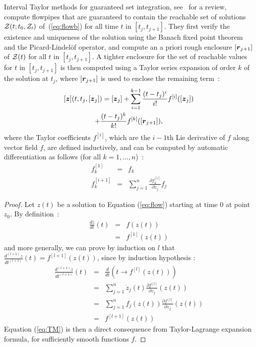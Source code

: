 \documentclass{sig-alternate-05-2015} %
\begin{document}
Interval Taylor methods for guaranteed set integration, see~\cite{Nedialkov99} for a review, compute flowpipes that are guaranteed
 to contain the reachable set of solutions 
${\cal Z}(t;t_0, {\cal Z_0})$ of~(\ref{eq:flowb}) for all time $t$ in $[t_j,t_{j+1}]$. They first verify the existence and uniqueness of 
the solution using the Banach fixed point theorem and the Picard-Lindel\"of operator, and compute an a priori rough enclosure $[{\r}_{j+1}]$ of 
   ${\cal Z}(t)$ for all $t$ in $[t_j,t_{j+1}]$. A tighter enclosure for the set of reachable values for $t$ in $[t_j,t_{j+1}]$ is then computed 
using a Taylor series expansion of order $k$ of the solution at $t_j$, where $[{\r}_{j+1}]$ is used to enclose the remaining term~: 
\begin{multline} 
[\z](t,t_j,[{\z}_j]) =  [{\z}_j] + \sum\limits_{i=1}^{k-1} \frac{(t-t_j)^i}{i !} f^{[i]}([{\z}_j])\\
 + \frac{(t-t_j)^k}{k !} f^{[k]}([{\r}_{j+1}]),
\label{eq:TM}
\end{multline}
where the Taylor coefficients $f^{[i]}$, which are the $i-1$th Lie derivative of $f$ along
vector field $f$, are defined inductively, and 
can be computed by automatic differentiation as follows (for all $k=1,\ldots,n$)~: 
\begin{eqnarray}
f^{[1]}_k & = & f_k \\
f^{[i+1]}_k & = & \sum\limits_{j=1}^n \frac{\partial{f^{[i]}_k}}{\partial z_j} f_j
\label{Lie1}
\end{eqnarray}

\begin{proof}
Let $z(t)$ be a solution to Equation (\ref{eq:flow}) starting at
time 0 at point $z_0$. By definition~: 
$$
\begin{array}{rcl}
\frac{d z}{d t}(t) & = & f(z(t)) \\
& = & f^{[1]}(z(t))
\end{array}$$
\noindent and more generally, we can prove by induction on $l$ that 
$\frac{d^{(l+1)} z}{dt^{(l+1)}}(t) = f^{[l+1]}(z(t))$, 
since by induction hypothesis :
$$\begin{array}{rcl}
\frac{d^{(l+1)} z}{dt^{(l+1)}}(t) & = & \frac{d}{dt}\left(t \rightarrow
f^{[l]}(z(t))\right) \\
& = & \sum\limits_{j=1}^n \dot{z}_j(t) \frac{\partial f^{[l]}}{\partial z_j}(z(t)) \\
& = & \sum\limits_{j=1}^n f_j(z(t)) \frac{\partial f^{[l]}}{\partial z_j}(z(t)) \\
& = & f^{[l+1]}(z(t))
\end{array}$$
Equation (\ref{eq:TM}) is then a direct consequence from Taylor-Lagrange expansion
formula, for sufficiently smooth functions $f$. 
\end{proof}
\end{document}
